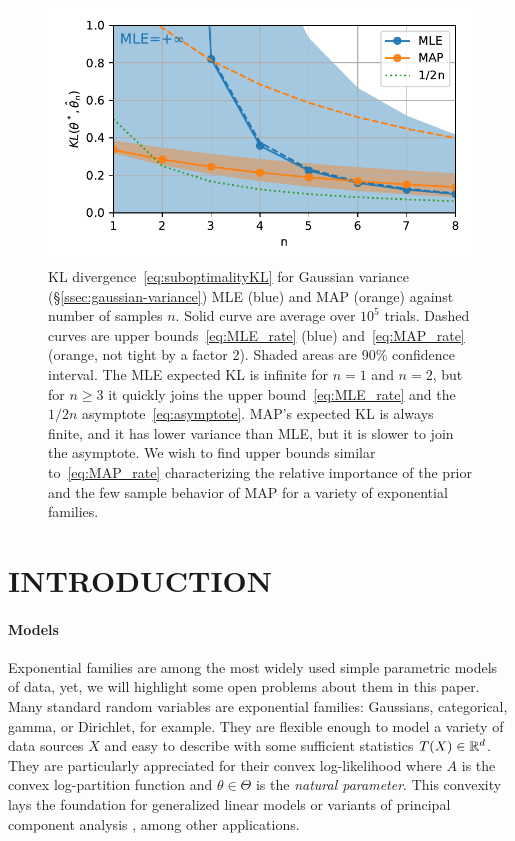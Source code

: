 \documentclass[twoside]{article}
\newcommand{\logpart}{A}
\newcommand{\nat}{\theta}
\newcommand{\lin}[1]{\left\langle#1\right\rangle}
\begin{document}
\begin{figure}[t]
	\centering
\includegraphics[width=.4\textwidth]{gammaMAPrate.pdf}
	\caption{KL divergence~\eqref{eq:suboptimalityKL} for Gaussian variance (\S\ref{ssec:gaussian-variance}) MLE (blue) and MAP (orange) against number of samples $n$. 
		Solid curve  are average over $10^5$ trials.
		Dashed curves are upper bounds~\eqref{eq:MLE_rate} (blue) and~\eqref{eq:MAP_rate} (orange, not tight by a factor 2).
		Shaded areas are 90\% confidence interval.
		The MLE expected KL is infinite for $n=1$ and $n=2$, but for $n\geq3$ it quickly joins the upper bound~\eqref{eq:MLE_rate} and the $1/2n$ asymptote~\eqref{eq:asymptote}.
		MAP's expected KL is always finite, and it has lower variance than MLE, but it is slower to join the asymptote.
		We wish to find upper bounds similar to~\eqref{eq:MAP_rate} characterizing the relative importance of the prior and the few sample behavior of MAP for a variety of exponential families.
	}
	\label{fig:curves}
\end{figure}


\section{INTRODUCTION}
\label{sec:motivation}

\paragraph{Models}
Exponential families are among the most widely used simple parametric models of data, yet, we will highlight some open problems about them in this paper.
Many standard random variables are exponential families: Gaussians, categorical, gamma, or Dirichlet, for example.
They are flexible enough to model a variety of data sources $X$ and easy to describe with some sufficient statistics $T(X) \in \mathbb{R}^d$.
They are particularly appreciated for their convex log-likelihood
\alignn{
f(\nat) := \E[-\log p_\nat(X)] = \logpart(\nat) - \lin{\E[T(X)] , \nat},
\label{eq:defNLL}
}
where $\logpart$ is the convex log-partition function and $\nat\in\Theta$ is the \textit{natural parameter}.
This convexity lays the foundation for generalized linear models \citep{mccullagh1989generalized} or variants of principal component analysis \citep{collins2001generalization}, among other applications.
\end{document}
